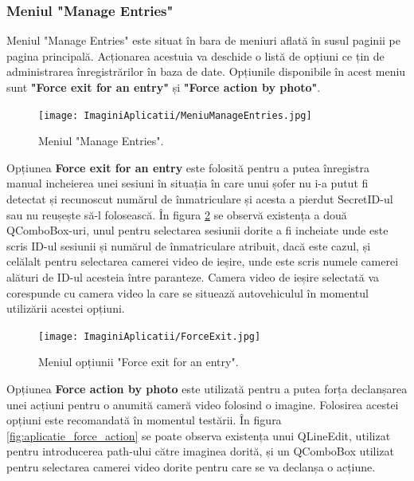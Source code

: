 \documentclass[12pt]{article}
\begin{document}
\subsubsection{Meniul "Manage Entries"}

Meniul "Manage Entries" este situat \^{i}n bara de meniuri aflat\u{a} \^{i}n susul paginii pe pagina principal\u{a}. Acționarea acestuia va deschide o list\u{a} de opțiuni ce țin de administrarea \^{i}nregistr\u{a}rilor \^{i}n baza de date. Opțiunile disponibile \^{i}n acest meniu sunt \textbf{"Force exit for an entry"} și \textbf{"Force action by photo"}.

\begin{figure}[H]
  \centering
  \texttt{[image: ImaginiAplicatii/MeniuManageEntries.jpg]}
  \caption{Meniul "Manage Entries".}
  \label{fig:aplicatie_meniul_manage_entries}
\end{figure}

Opțiunea \textbf{Force exit for an entry} este folosit\u{a} pentru a putea \^{i}nregistra manual incheierea unei sesiuni \^{i}n situația \^{i}n care unui șofer nu i-a putut fi detectat și recunoscut num\u{a}rul de \^{i}nmatriculare și acesta a pierdut SecretID-ul sau nu reușește s\u{a}-l foloseasc\u{a}. \^{I}n figura \ref{fig:aplicatie_force_exit} se observ\u{a} existența a dou\u{a} QComboBox-uri, unul pentru selectarea sesiunii dorite a fi incheiate unde este scris ID-ul sesiunii și num\u{a}rul de \^{i}nmatriculare atribuit, dac\u{a} este cazul, și cel\u{a}lalt pentru selectarea camerei video de ieșire, unde este scris numele camerei al\u{a}turi de ID-ul acesteia \^{i}ntre paranteze. Camera video de ieșire selectat\u{a} va corespunde cu camera video la care se situeaz\u{a} autovehiculul \^{i}n momentul utiliz\u{a}rii acestei opțiuni.

\begin{figure}[H]
  \centering
  \texttt{[image: ImaginiAplicatii/ForceExit.jpg]}
  \caption{Meniul opțiunii "Force exit for an entry".}
  \label{fig:aplicatie_force_exit}
\end{figure}

Opțiunea \textbf{Force action by photo} este utilizat\u{a} pentru a putea forța declanșarea unei acțiuni pentru o anumit\u{a} camer\u{a} video folosind o imagine. Folosirea acestei opțiuni este recomandat\u{a} \^{i}n momentul test\u{a}rii. \^{I}n figura \ref{fig:aplicatie_force_action} se poate observa existența unui QLineEdit, utilizat pentru introducerea path-ului c\u{a}tre imaginea dorit\u{a}, și un QComboBox utilizat pentru selectarea camerei video dorite pentru care se va declanșa o acțiune.
\end{document}
